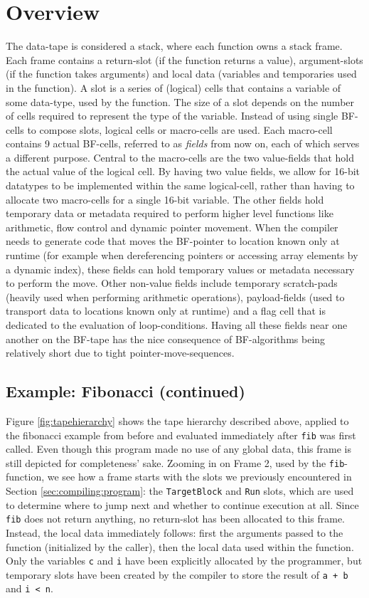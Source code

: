 \section{Overview}
The data-tape is considered a stack, where each function owns a stack frame. Each frame contains a return-slot (if the function returns a value), argument-slots (if the function takes arguments) and local data (variables and temporaries used in the function). A slot is a series of (logical) cells that contains a variable of some data-type, used by the function. The size of a slot depends on the number of cells required to represent the type of the variable. Instead of using single BF-cells to compose slots, logical cells or macro-cells are used. Each macro-cell contains 9 actual BF-cells, referred to as \emph{fields} from now on, each of which serves a different purpose. Central to the macro-cells are the two value-fields that hold the actual value of the logical cell. By having two value fields, we allow for 16-bit datatypes to be implemented within the same logical-cell, rather than having to allocate two macro-cells for a single 16-bit variable. The other fields hold temporary data or metadata required to perform higher level functions like arithmetic, flow control and dynamic pointer movement. When the compiler needs to generate code that moves the BF-pointer to location known only at runtime (for example when dereferencing pointers or accessing array elements by a dynamic index), these fields can hold temporary values or metadata necessary to perform the move. Other non-value fields include temporary scratch-pads (heavily used when performing arithmetic operations), payload-fields (used to transport data to locations known only at runtime) and a flag cell that is dedicated to the evaluation of loop-conditions. Having all these fields near one another on the BF-tape has the nice consequence of BF-algorithms being relatively short due to tight pointer-move-sequences.

\subsection*{Example: Fibonacci (continued)}
Figure \ref{fig:tapehierarchy} shows the tape hierarchy described above, applied to the fibonacci example from before and evaluated immediately after \texttt{fib} was first called. Even though this program made no use of any global data, this frame is still depicted for completeness' sake. Zooming in on Frame 2, used by the \texttt{fib}-function, we see how a frame starts with the slots we previously encountered in Section \ref{sec:compiling:program}: the \texttt{TargetBlock} and \texttt{Run} slots, which are used to determine where to jump next and whether to continue execution at all. Since \texttt{fib} does not return anything, no return-slot has been allocated to this frame. Instead, the local data immediately follows: first the arguments passed to the function (initialized by the caller), then the local data used within the function. Only the variables \texttt{c} and \texttt{i} have been explicitly allocated by the programmer, but temporary slots have been created by the compiler to store the result of \texttt{a + b} and \texttt{i < n}.

